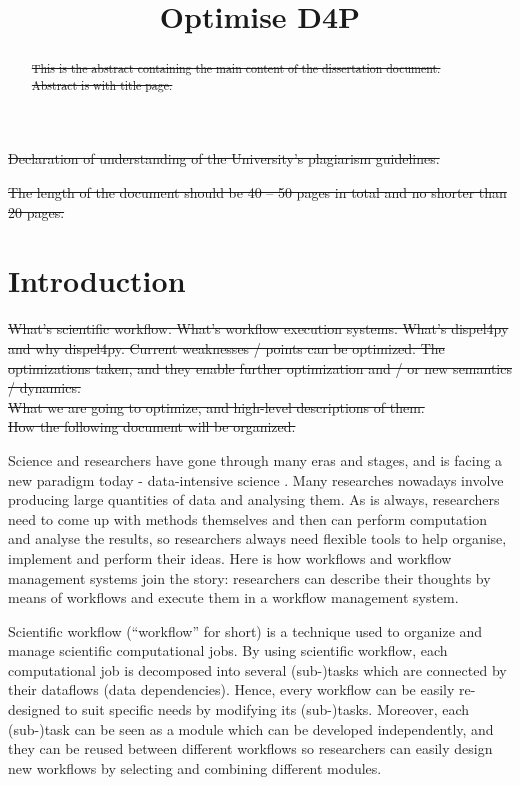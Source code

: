 \documentclass[•]{article}
\title{Optimise D4P}
\begin{document}
	\maketitle
	\begin{abstract}
	\sout{This is the abstract containing the main content of the dissertation document. Abstract is with title page.}
	\end{abstract}
	\pagebreak
	
	\sout{Declaration of understanding of the University's plagiarism guidelines.	}
	
	\pagebreak	
	
	\sout{The length of the document should be 40 -- 50 pages in total and no shorter than 20 pages.}
	\section{Introduction}
	\sout{What's scientific workflow. What's workflow execution systems. What's dispel4py and why dispel4py. Current weaknesses / points can be optimized. The optimizations taken, and they enable further optimization and / or new semantics / dynamics. \\
	What we are going to optimize, and high-level descriptions of them. \\
	How the following document will be organized.}
	
	Science and researchers have gone through many eras and stages, and is facing a new paradigm today - data-intensive science \cite{hey2009fourth}. Many researches nowadays involve producing large quantities of data and analysing them. As is always, researchers need to come up with methods themselves and then can perform computation and analyse the results, so researchers always need flexible tools to help organise, implement and perform their ideas. Here is how workflows and workflow management systems join the story: researchers can describe their thoughts by means of workflows and execute them in a workflow management system.
	
	Scientific workflow (``workflow'' for short) is a technique used to organize and manage scientific computational jobs. By using scientific workflow, each computational job is decomposed into several (sub-)tasks which are connected by their dataflows (data dependencies). Hence, every workflow can be easily re-designed to suit specific needs by modifying its (sub-)tasks. Moreover, each (sub-)task can be seen as a module which can be developed independently, and they can be reused between different workflows so researchers can easily design new workflows by selecting and combining different modules.
	
\end{document}
